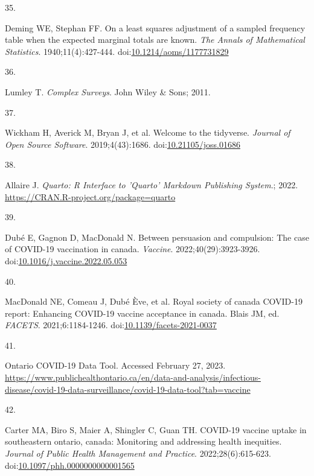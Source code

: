 \documentclass[
  letterpaper,
  DIV=11,
  numbers=noendperiod]{scrartcl}
\newlength{\cslhangindent}
\newlength{\csllabelwidth}
\newlength{\cslentryspacingunit} %
\newenvironment{CSLReferences}[2] %
 {%
  \setlength{\parindent}{0pt}
  \ifodd #1
  \let\oldpar\par
  \def\par{\hangindent=\cslhangindent\oldpar}
  \fi
  \setlength{\parskip}{#2\cslentryspacingunit}
 }%
 {}
\newcommand{\CSLLeftMargin}[1]{\parbox[t]{\csllabelwidth}{#1}}
\newcommand{\CSLRightInline}[1]{\parbox[t]{\linewidth - \csllabelwidth}{#1}\break}
\begin{document}
\begin{CSLReferences}{0}{0}
\leavevmode{}%
\CSLLeftMargin{35. }%
\CSLRightInline{Deming WE, Stephan FF. On a least squares adjustment of
a sampled frequency table when the expected marginal totals are known.
\emph{The Annals of Mathematical Statistics}. 1940;11(4):427-444.
doi:\href{https://doi.org/10.1214/aoms/1177731829}{10.1214/aoms/1177731829}}

\leavevmode{}%
\CSLLeftMargin{36. }%
\CSLRightInline{Lumley T. \emph{Complex Surveys}. John Wiley \& Sons;
2011.}

\leavevmode{}%
\CSLLeftMargin{37. }%
\CSLRightInline{Wickham H, Averick M, Bryan J, et al. Welcome to the
{tidyverse}. \emph{Journal of Open Source Software}. 2019;4(43):1686.
doi:\href{https://doi.org/10.21105/joss.01686}{10.21105/joss.01686}}

\leavevmode{}%
\CSLLeftMargin{38. }%
\CSLRightInline{Allaire J. \emph{Quarto: R Interface to 'Quarto'
Markdown Publishing System}.; 2022.
\url{https://CRAN.R-project.org/package=quarto}}

\leavevmode{}%
\CSLLeftMargin{39. }%
\CSLRightInline{Dubé E, Gagnon D, MacDonald N. Between persuasion and
compulsion: The case of {COVID}-19 vaccination in canada.
\emph{Vaccine}. 2022;40(29):3923-3926.
doi:\href{https://doi.org/10.1016/j.vaccine.2022.05.053}{10.1016/j.vaccine.2022.05.053}}

\leavevmode{}%
\CSLLeftMargin{40. }%
\CSLRightInline{MacDonald NE, Comeau J, Dubé Ève, et al. Royal society
of canada {COVID}-19 report: Enhancing {COVID}-19 vaccine acceptance in
canada. Blais JM, ed. \emph{{FACETS}}. 2021;6:1184-1246.
doi:\href{https://doi.org/10.1139/facets-2021-0037}{10.1139/facets-2021-0037}}

\leavevmode{}%
\CSLLeftMargin{41. }%
\CSLRightInline{{Ontario COVID-19 Data Tool}. Accessed February 27,
2023.
\url{https://www.publichealthontario.ca/en/data-and-analysis/infectious-disease/covid-19-data-surveillance/covid-19-data-tool?tab=vaccine}}

\leavevmode{}%
\CSLLeftMargin{42. }%
\CSLRightInline{Carter MA, Biro S, Maier A, Shingler C, Guan TH.
{COVID}-19 vaccine uptake in southeastern ontario, canada: Monitoring
and addressing health inequities. \emph{Journal of Public Health
Management and Practice}. 2022;28(6):615-623.
doi:\href{https://doi.org/10.1097/phh.0000000000001565}{10.1097/phh.0000000000001565}}


\end{CSLReferences}
\end{document}
